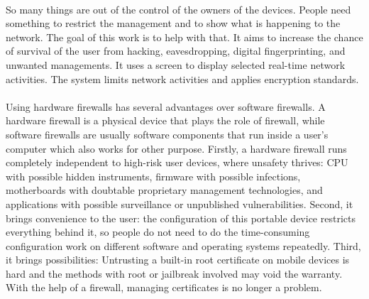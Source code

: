 \documentclass[mscthesis]{usiinfthesis}
\begin{document}
\paragraph{}
So many things are out of the control of the owners of the devices. People need something to restrict the management and to show what is happening to the network. The goal of this work is to help with that. It aims to increase the chance of survival of the user from hacking, eavesdropping, digital fingerprinting, and unwanted managements. It uses a screen to display selected real-time network activities. The system limits network activities and applies encryption standards.
\paragraph{}
Using hardware firewalls has several advantages over software firewalls. A hardware firewall is a physical device that plays the role of firewall, while software firewalls are usually software components that run inside a user's computer which also works for other purpose. Firstly, a hardware firewall runs completely independent to high-risk user devices, where unsafety thrives: CPU with possible hidden instruments, firmware with possible infections, motherboards with doubtable proprietary management technologies, and applications with possible surveillance or unpublished vulnerabilities. Second, it brings convenience to the user: the configuration of this portable device restricts everything behind it, so people do not need to do the time-consuming configuration work on different software and operating systems repeatedly. Third, it brings possibilities: Untrusting a built-in root certificate on mobile devices is hard and the methods with root or jailbreak involved may void the warranty. With the help of a firewall, managing certificates is no longer a problem.
\end{document}
